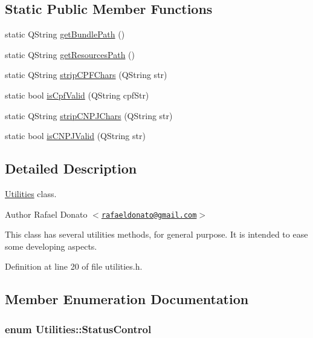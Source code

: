 \subsection*{\-Static \-Public \-Member \-Functions}
\begin{DoxyCompactItemize}
\item 
static \-Q\-String \hyperlink{class_utilities_a2caa66e89881ca149ab59ebd947f03c2}{get\-Bundle\-Path} ()
\item 
static \-Q\-String \hyperlink{class_utilities_a11843b163f2780b09cecd308880b3af2}{get\-Resources\-Path} ()
\item 
static \-Q\-String \hyperlink{class_utilities_a18ef0b04d52a9ef1a170d162b2b573c7}{strip\-C\-P\-F\-Chars} (\-Q\-String str)
\item 
static bool \hyperlink{class_utilities_a18252596785936749f8b573ac9ca1a13}{is\-Cpf\-Valid} (\-Q\-String cpf\-Str)
\item 
static \-Q\-String \hyperlink{class_utilities_a62ee1ac606e7c96da2f1819d21dcec03}{strip\-C\-N\-P\-J\-Chars} (\-Q\-String str)
\item 
static bool \hyperlink{class_utilities_ae2c1db542d657573973032c5b580e657}{is\-C\-N\-P\-J\-Valid} (\-Q\-String str)
\end{DoxyCompactItemize}


\subsection{\-Detailed \-Description}
\hyperlink{class_utilities}{\-Utilities} class. 

\begin{DoxyAuthor}{\-Author}
\-Rafael \-Donato $<$\href{mailto:rafaeldonato@gmail.com}{\tt rafaeldonato@gmail.\-com}$>$
\end{DoxyAuthor}
\-This class has several utilities methods, for general purpose. \-It is intended to ease some developing aspects. 

\-Definition at line 20 of file utilities.\-h.



\subsection{\-Member \-Enumeration \-Documentation}
\hypertarget{class_utilities_a2974f062d85bdb0c444a1cbe554bf228}{
\subsubsection[{\-Status\-Control}]{\setlength{\rightskip}{0pt plus 5cm}enum {\bf \-Utilities\-::\-Status\-Control}}}\label{class_utilities_a2974f062d85bdb0c444a1cbe554bf228}


